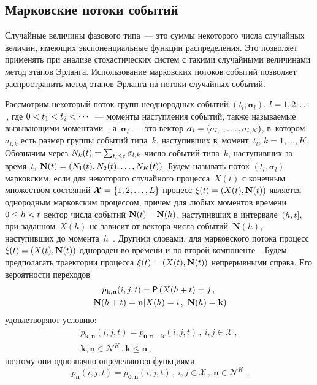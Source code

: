 {\begin{multicols}{2}
\section{Марковские потоки событий}

  Случайные величины фазового типа~--- это суммы некоторого числа 
случайных величин, име\-ющих экспоненциальные функции распределения. Это 
позволяет применять при анализе стохастических систем с такими случайными 
величинами метод этапов Эрланга. Использование марковских потоков 
событий позволяет распространить метод этапов Эрланга на потоки 
случайных событий.
  
  Рассмотрим некоторый поток групп неоднородных событий $(t_l, 
\boldsymbol{\sigma}_l)$, $l\hm=1,2,\ldots$\,, где $0\hm< t_1\hm< t_2<\cdots $~--- 
моменты наступления событий, также называемые вызывающими 
моментами~\cite{22-n}, а~$\boldsymbol{\sigma}_l$~--- это вектор 
$\boldsymbol{\sigma}_l\hm= (\sigma_{l,1},\ldots , \sigma_{l,K})$, 
в~котором~$\sigma_{l,k}$ есть размер группы событий типа~$k$, наступивших 
в~момент~$t_l$, $k=1,\ldots,K$. 
Обозначим через $N_k(t)\hm= \sum\nolimits_{t_l\leq t} 
\sigma_{l,k}$ число событий типа~$k$, наступивших за время~$t$, 
$\mathbf{N}(t)\hm= (N_1(t), N_2(t),\ldots , N_K(t))$.  Будем называть поток 
$(t_l,\boldsymbol{\sigma}_l)$ марковским, если для некоторого случайного 
процесса~$X(t)$ с конечным множеством состояний 
$\boldsymbol{\mathcal{X}}\hm= \{1,2,\ldots , L\}$ процесс $\xi(t)\hm= (X(t), 
\mathbf{N}(t))$ является однородным марковским процессом,  причем для 
любых моментов времени $0\hm\leq h\hm< t$ вектор числа событий 
$\mathbf{N}(t)\hm- \mathbf{N}(h)$, наступивших в интервале~$(h,t]$, при 
заданном~$X(h)$ не зависит от вектора числа событий~$\mathbf{N}(h)$, 
наступивших до момента~$h$~\cite{23-n}. Другими словами, для марковского 
потока процесс $\xi(t)\hm= (X(t), \mathbf{N}(t))$ однороден во времени и по 
второй компоненте~\cite{24-n}. Будем предполагать траектории процесса 
$\xi(t)\hm= (X(t),\mathbf{N}(t))$ непрерывными справа. Его вероятности 
переходов 
  \begin{multline}
  p_{\mathbf{k},\mathbf{n}}(i,j,t)={\sf P}\left (X(h+t)=j\,,\right.\\
\left.  \mathbf{N}(h+t)=\mathbf{n}\vert  X(h)=i\,,\ \mathbf{N}(h)=\mathbf{k}\right)
  \label{e6-n}
  \end{multline}
удовлетворяют условию:
\begin{multline}
p_{\mathbf{k},\mathbf{n}}(i,j,t)= p_{\mathbf{0},\mathbf{n}-\mathbf{k}}(i,j,t)\,,\ 
i,j\in \boldsymbol{\mathcal{X}}\,,\\
 \mathbf{k},\mathbf{n}\in 
\boldsymbol{\mathcal{N}}^K\,,\mathbf{k}\leq \mathbf{n}\,,
\label{e7-n}
\end{multline}
поэтому они однозначно определяются функциями
\begin{equation*}
p_{\mathbf{n}}(i,j,t)=p_{\mathbf{0},\mathbf{n}}(i,j,t)\,,\ i,j\in 
\boldsymbol{\mathcal{X}}\,,\ \mathbf{n}\in \boldsymbol{\mathcal{N}}^K\,.
\end{equation*}
  

\end{multicols}}
